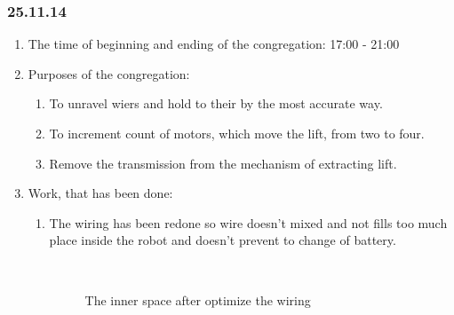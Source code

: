 \subsubsection{25.11.14}

\begin{enumerate}
	\item The time of beginning and ending of the congregation:
	17:00 - 21:00
	\item Purposes of the congregation:
	\begin{enumerate}
		\item To unravel wiers and hold to their by the most accurate way.
		
		\item To increment count of motors, which move the lift, from two to four.
		
		\item Remove the transmission from the mechanism of extracting lift.
		
	\end{enumerate}
	\item Work, that has been done:
	\begin{enumerate}
		\item The wiring has been redone so wire doesn't mixed and not fills too much place inside the robot and doesn't prevent to change of battery.
		
		\begin{figure}[H]
			\begin{minipage}[h]{0.2\linewidth}
				\center  
			\end{minipage}
			\begin{minipage}[h]{0.6\linewidth}
				\caption{The inner space after	optimize the wiring}
			\end{minipage}
		\end{figure}
		

\end{enumerate}
\end{enumerate}
